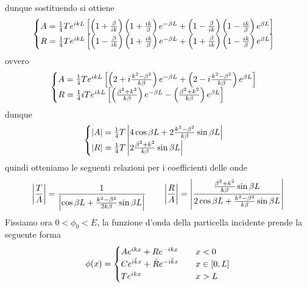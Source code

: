 \documentclass{article}
\begin{document}
dunque sostituendo si ottiene
\begin{gather}
    \begin{cases}
        A = \frac{1}{4}Te^{ikL}\left[ \left(1 + \frac{\beta}{ik} \right)\left( 1 + \frac{ik}{\beta} \right)e^{-\beta L} + \left( 1 - \frac{\beta}{ik} \right)\left( 1 - \frac{ik}{\beta} \right)e^{\beta L} \right] \\
        R = \frac{1}{4}Te^{ikL}\left[ \left( 1 - \frac{\beta}{ik} \right)\left( 1 + \frac{ik}{\beta} \right)e^{-\beta L} + \left( 1 + \frac{\beta}{ik} \right)\left( 1 - \frac{ik}{\beta} \right)e^{\beta L} \right]
    \end{cases} \notag
\end{gather}
ovvero
\begin{gather}
    \begin{cases}
        A = \frac{1}{4}Te^{ikL}\left[ \left( 2 + i\frac{k^2 - \beta^2}{k\beta} \right)e^{-\beta L} + \left( 2 - i\frac{k^2 - \beta^2}{k\beta} \right) e^{\beta L} \right] \\
        R = \frac{1}{4}iTe^{ikL}\left[ \left( \frac{\beta^2 + k^2}{k\beta} \right)e^{-\beta L} - \left( \frac{\beta^2 + k^2}{k\beta} \right)e^{\beta L} \right]
    \end{cases} \notag
\end{gather}
dunque
\begin{gather}
    \begin{cases}
        |A| = \frac{1}{4}T\left| 4\cos \beta L + 2\frac{k^2 - \beta^2}{k\beta}\sin \beta L \right| \\
        |R| = \frac{1}{4}T\left| 2\frac{\beta^2 + k^2}{k\beta}\sin \beta L \right|
    \end{cases} \notag
\end{gather}
quindi otteniamo le seguenti relazioni per i coefficienti delle onde
\begin{gather}
    \left| \frac{T}{A} \right| = \frac{1}{\left| \cos \beta L + \frac{k^2 - \beta^2}{2k\beta}\sin \beta L \right|} \qquad \left| \frac{R}{A} \right| = \left| \frac{\frac{\beta^2 + k^2}{k\beta}\sin \beta L}{2\cos \beta L + \frac{k^2 - \beta^2}{k\beta}\sin \beta L} \right| \notag
\end{gather}
Fissiamo ora $0 < \phi_0 < E$, la funzione d'onda della particella incidente prende la seguente forma
\begin{gather}
    \phi(x) = \begin{cases}
        Ae^{ikx} + Re^{-ikx} \quad &x < 0 \\
        Ce^{i\tilde{k}x} + \tilde{R}e^{-i\tilde{k}x} \quad &x \in [0, L] \\
        Te^{ikx} \quad &x > L
    \end{cases} \notag
\end{gather}
\end{document}

